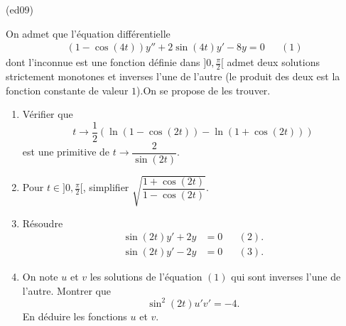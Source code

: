 \begin{tiny}(ed09)\end{tiny}
On admet que l'équation différentielle
\begin{align*}
 (1-\cos (4t))y'' +2\sin (4t) y' -8y = 0 & & (1)
\end{align*}
dont l'inconnue est une fonction définie dans $]0,\frac{\pi}{2}[$ admet deux solutions strictement monotones et inverses l'une de l'autre (le produit des deux est la fonction constante de valeur $1$).\newline On se propose de les trouver.
\begin{enumerate}
 \item Vérifier que 
\begin{displaymath}
 t\rightarrow \dfrac{1}{2}\left( \ln(1-\cos(2t)) - \ln(1+\cos(2t))\right) 
\end{displaymath}
est une primitive de $t\rightarrow \dfrac{2}{\sin(2t)}$.
\item Pour $t\in]0,\frac{\pi}{2}[$, simplifier $\sqrt{\dfrac{1+\cos(2t)}{1-\cos(2t)}}$.
\item Résoudre 
\[
\begin{aligned}
 \sin(2t)y'+2y &= 0 & & (2).\\
 \sin(2t)y'-2y &= 0 & & (3).
\end{aligned} 
\]
\item On note $u$ et $v$ les solutions de l'équation $(1)$ qui sont inverses l'une de l'autre. Montrer que 
\begin{displaymath}
 \sin^2(2t)u'v' = -4.
\end{displaymath}
En déduire les fonctions $u$ et $v$.
\end{enumerate}
